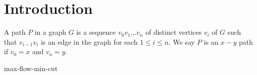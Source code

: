 \chapter{Introduction}

\begin{defn} A path $P$ in a graph $G$ is a sequence $v_0 v_1 \ldots v_n$ of distinct vertices $v_i$ of $G$ such that $v_{i-1} v_i$ is an edge in the graph for each $1 \leq i \leq n$. We say $P$ is an $x-y$ path if $v_0 = x$ and $v_n = y$. \end{defn}

max-flow-min-cut
